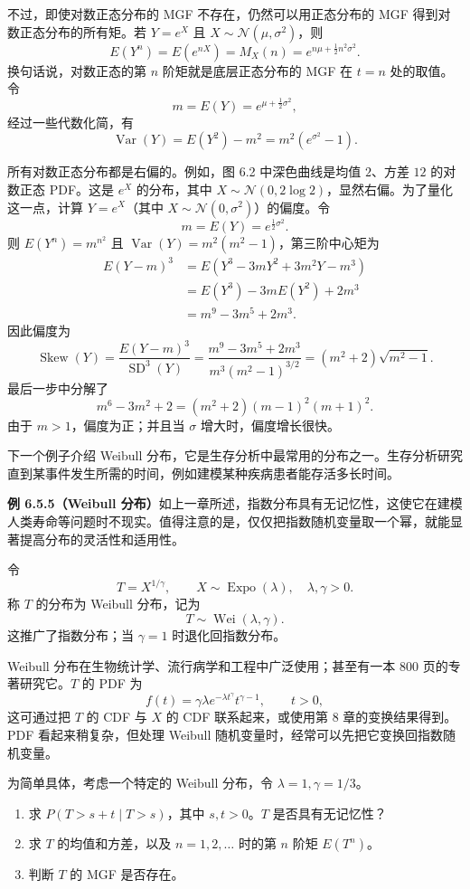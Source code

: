 \documentclass[UTF8, 12pt, fontset=fandol, oneside]{ctexart}
\begin{document}
不过，即使对数正态分布的 MGF 不存在，仍然可以用正态分布的 MGF 得到对数正态分布的所有矩。若 $Y=e^X$ 且 $X\sim\mathcal{N}(\mu,\sigma^2)$，则
\[
  E(Y^n)=E(e^{nX})=M_X(n)=e^{n\mu+\frac12n^2\sigma^2}.
\]
换句话说，对数正态的第 $n$ 阶矩就是底层正态分布的 MGF 在 $t=n$ 处的取值。令
\[
  m=E(Y)=e^{\mu+\frac12\sigma^2},
\]
经过一些代数化简，有
\[
  \operatorname{Var}(Y)=E(Y^2)-m^2=m^2(e^{\sigma^2}-1).
\]

所有对数正态分布都是右偏的。例如，图 6.2 中深色曲线是均值 $2$、方差 $12$ 的对数正态 PDF。这是 $e^X$ 的分布，其中 $X\sim\mathcal{N}(0,2\log2)$，显然右偏。为了量化这一点，计算 $Y=e^X$（其中 $X\sim\mathcal{N}(0,\sigma^2)$）的偏度。令
\[
  m=E(Y)=e^{\frac12\sigma^2}.
\]
则 $E(Y^n)=m^{n^2}$ 且 $\operatorname{Var}(Y)=m^2(m^2-1)$，第三阶中心矩为
\begin{align*}
  E(Y-m)^3
  &=E(Y^3-3mY^2+3m^2Y-m^3)\\
  &=E(Y^3)-3mE(Y^2)+2m^3\\
  &=m^9-3m^5+2m^3.
\end{align*}
因此偏度为
\[
  \operatorname{Skew}(Y)
  =
  \frac{E(Y-m)^3}{\operatorname{SD}^3(Y)}
  =
  \frac{m^9-3m^5+2m^3}{m^3(m^2-1)^{3/2}}
  =
  (m^2+2)\sqrt{m^2-1}.
\]
最后一步中分解了
\[
  m^6-3m^2+2=(m^2+2)(m-1)^2(m+1)^2.
\]
由于 $m>1$，偏度为正；并且当 $\sigma$ 增大时，偏度增长很快。

下一个例子介绍 Weibull 分布，它是生存分析中最常用的分布之一。生存分析研究直到某事件发生所需的时间，例如建模某种疾病患者能存活多长时间。

\noindent\textbf{例 6.5.5（Weibull 分布）}\quad 如上一章所述，指数分布具有无记忆性，这使它在建模人类寿命等问题时不现实。值得注意的是，仅仅把指数随机变量取一个幂，就能显著提高分布的灵活性和适用性。

令
\[
  T=X^{1/\gamma},\qquad X\sim\operatorname{Expo}(\lambda),\quad \lambda,\gamma>0.
\]
称 $T$ 的分布为 Weibull 分布，记为
\[
  T\sim\operatorname{Wei}(\lambda,\gamma).
\]
这推广了指数分布；当 $\gamma=1$ 时退化回指数分布。

Weibull 分布在生物统计学、流行病学和工程中广泛使用；甚至有一本 800 页的专著研究它。$T$ 的 PDF 为
\[
  f(t)=\gamma\lambda e^{-\lambda t^\gamma}t^{\gamma-1},\qquad t>0,
\]
这可通过把 $T$ 的 CDF 与 $X$ 的 CDF 联系起来，或使用第 8 章的变换结果得到。PDF 看起来稍复杂，但处理 Weibull 随机变量时，经常可以先把它变换回指数随机变量。

为简单具体，考虑一个特定的 Weibull 分布，令 $\lambda=1,\gamma=1/3$。

\begin{enumerate}
  \item 求 $P(T>s+t\mid T>s)$，其中 $s,t>0$。$T$ 是否具有无记忆性？
  \item 求 $T$ 的均值和方差，以及 $n=1,2,\ldots$ 时的第 $n$ 阶矩 $E(T^n)$。
  \item 判断 $T$ 的 MGF 是否存在。
\end{enumerate}
\end{document}
